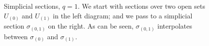 \documentclass[10pt]{amsart}
\theoremstyle{definition}
\numberwithin{equation}{section}
\begin{document}
\begin{figure}
%
\caption{Simplicial sections, $q = 1$. 
We start with sections over two open sets $U_{(0)}$ and $U_{(1)}$ 
in the left diagram; and we pass to a simplicial 
section $\sigma_{(0, 1)}$ on the right. As can be seen, 
$\sigma_{(0, 1)}$ interpolates between $\sigma_{(0)}$ and 
$\sigma_{(1)}$.}
\label{fig1}
\end{figure}
\end{document}
